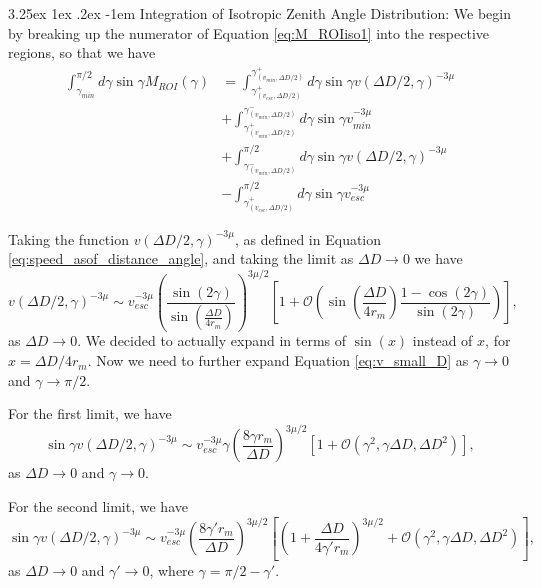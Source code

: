 \documentclass{hitec}
\makeatletter
\numberwithin{equation}{section}
\renewcommand\paragraph{\@startsection{paragraph}{5}{\z@}%
	{3.25ex \@plus1ex \@minus.2ex}%
	{-1em}%
	{\normalfont\normalsize\bfseries}}
\makeatother
\begin{document}
\paragraph{Integration of Isotropic Zenith Angle Distribution:}
We begin by breaking up the numerator of Equation \eqref{eq:M_ROIiso1} into the respective regions, so that we have
\begin{align}
\int_{\gamma_{min}}^{\pi/2}d\gamma\sin\gamma M_{ROI}(\gamma) &= \int_{\gamma^+_{(v_{esc},\Delta D/2)}}^{\gamma^+_{(v_{min},\Delta D/2)}} d\gamma\sin\gamma v(\Delta D/2, \gamma)^{-3\mu}\\\nonumber
&+ \int_{\gamma^+_{(v_{min},\Delta D/2)}}^{\gamma^-_{(v_{min},\Delta D/2)}} d\gamma\sin\gamma v_{min}^{-3\mu}\\\nonumber
&+ \int_{\gamma^-_{(v_{min},\Delta D/2)}}^{\pi/2} d\gamma\sin\gamma v(\Delta D/2, \gamma)^{-3\mu}\\\nonumber
&- \int_{\gamma^+_{(v_{esc},\Delta D/2)}}^{\pi/2} d\gamma\sin\gamma v_{esc}^{-3\mu}
\end{align}

Taking the function $v(\Delta D/2, \gamma)^{-3\mu}$, as defined in Equation \eqref{eq:speed_asof_distance_angle}, and taking the limit as $\Delta D\to 0$ we have
\begin{equation}\label{eq:v_small_D}
v(\Delta D/2, \gamma)^{-3\mu} \sim v_{esc}^{-3\mu}\left(\frac{\sin(2\gamma)}{\sin\left(\frac{\Delta D}{4r_m}\right)}\right)^{3\mu/2}\left[1 + \mathcal{O}\left(\sin\left(\frac{\Delta D}{4r_m}\right)\frac{1-\cos(2\gamma)}{\sin(2\gamma)}\right)\right],
\end{equation}
as $\Delta D\to 0$. We decided to actually expand in terms of $\sin(x)$ instead of $x$, for $x = \Delta D/4r_m$. Now we need to further expand Equation \eqref{eq:v_small_D} as $\gamma\to 0$ and $\gamma\to \pi/2$.

For the first limit, we have
\begin{equation}
\sin\gamma v(\Delta D/2, \gamma)^{-3\mu} \sim
v_{esc}^{-3\mu} \gamma\left(\frac{8\gamma r_m}{\Delta D}\right)^{3\mu/2}\left[1 + \mathcal{O}(\gamma^2,\gamma\Delta D,\Delta D^2)\right],
\end{equation}
as $\Delta D\to 0$ and $\gamma\to 0$.

For the second limit, we have
\begin{equation}
\sin\gamma v(\Delta D/2, \gamma)^{-3\mu} \sim
v_{esc}^{-3\mu} \left(\frac{8\gamma' r_m}{\Delta D}\right)^{3\mu/2} \left[\left(1+\frac{\Delta D}{4\gamma' r_m}\right)^{3\mu/2} + \mathcal{O}(\gamma^2,\gamma\Delta D,\Delta D^2)\right],
\end{equation}
as $\Delta D\to 0$ and $\gamma'\to 0$, where $\gamma = \pi/2 - \gamma'$.
\end{document}
